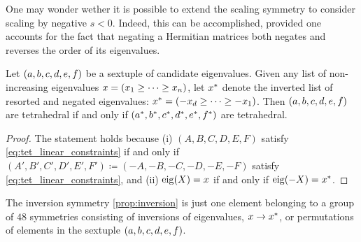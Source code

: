 \documentclass[notitlepage, 10pt]{article}
\begin{document}
One may wonder wether it is possible to extend the scaling symmetry to consider scaling by negative $s < 0$.
Indeed, this can be accomplished, provided one accounts for the fact that negating a Hermitian matrices both negates and reverses the order of its eigenvalues.
\begin{prop}
    \label{prop:inversion}
    Let $(a, b, c, d, e, f)$ be a sextuple of candidate eigenvalues. 
    Given any list of non-increasing eigenvalues $x = (x_1 \geq \cdots \geq x_n)$, let $x^{*}$ denote the inverted list of resorted and negated eigenvalues: $x^{*} = (-x_d \geq \cdots \geq - x_1)$.
    Then $(a, b, c, d, e, f)$ are tetrahedral if and only if $(a^{*}, b^{*}, c^{*}, d^{*}, e^{*}, f^{*})$ are tetrahedral.
\end{prop}
\begin{proof}
    The statement holds because (i) $(A,B,C,D,E,F)$ satisfy \cref{eq:tet_linear_constraints} if and only if $(A',B',C',D',E',F') \coloneqq (-A,-B,-C,-D,-E,-F)$ satisfy \cref{eq:tet_linear_constraints}, and (ii) $\operatorname{eig}(X) = x$ if and only if $\operatorname{eig}(-X) = x^{*}$.
\end{proof}

The inversion symmetry \cref{prop:inversion} is just one element belonging to a group of $48$ symmetries consisting of inversions of eigenvalues, $x \rightarrow x^{*}$, or permutations of elements in the sextuple $(a,b,c,d,e,f)$.
\end{document}
